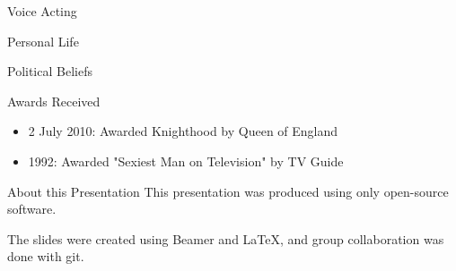 \documentclass[xcolor=dvipsnames]{beamer}
\begin{document}
\begin{frame}{Voice Acting}

\end{frame}

\begin{frame}{Personal Life}

\end{frame}

\begin{frame}{Political Beliefs}

\end{frame}

\begin{frame}{Awards Received}
  \begin{itemize}
    \item 2 July 2010: Awarded Knighthood by Queen of England
    \item 1992: Awarded "Sexiest Man on Television" by TV Guide
  \end{itemize}
  \end{frame}
\begin{frame}{About this Presentation}
  This presentation was produced using only open-source software.

  The slides were created using Beamer and LaTeX, and group collaboration was done
  with git.
\end{frame}
\end{document}
